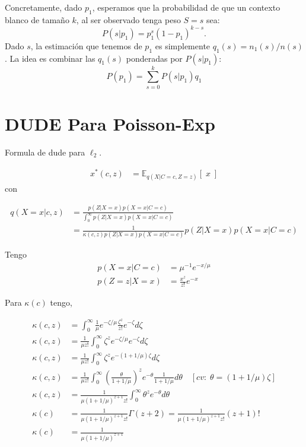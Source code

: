 \documentclass{article}
\def\opt{\ensuremath{^{*}}}
\def\loss{\ell}
\def\expect{\ensuremath{\mathbb{E}}}
\begin{document}
Concretamente, dado $p_1$, esperamos que la probabilidad de que un contexto blanco de tamaño $k$, al ser observado tenga peso $S=s$ sea:
$$P(s|p_1)=p_1^s(1-p_1)^{k-s}.$$
Dado $s$, la estimación que tenemos de $p_1$ es simplemente $q_1(s)=n_1(s)/n(s)$.
La idea es combinar las $q_1(s)$ ponderadas por $P(s|p_1)$:
$$P(p_1) = \sum_{s=0}^{k}P(s|p_1)q_1$$

\section{DUDE Para Poisson-Exp}

Formula de dude para $\ell_2$. 

\begin{align}
x\opt(c,z) &= \expect_{q(X|C=c,Z=z)}\left[\;x\;\right]
\end{align}
con

\begin{align}
q(X=x|c,z) &=
\frac{p(Z|X=x)p(X=x|C=c)}{\int_0^{\infty}{p(Z|X=x)p(X=x|C=c)}} \\
 &= \frac{1}{\kappa(c,z)p(Z|X=x)p(X=x|C=c)} p(Z|X=x)p(X=x|C=c) 
\end{align}


Tengo
\begin{align}
p(X=x|C=c) &= \mu^{-1} e^{-x/\mu}\\
p(Z=z|X=x) &= \frac{x^z}{z!}e^{-x}
\end{align}

Para $\kappa(c)$ tengo,

\begin{align}
\kappa(c,z) &= 
  \int_{0}^{\infty}
  {
    \frac{1}{\mu}
    e^{-\zeta/\mu}
    \frac{\zeta^z}{z!}
    e^{-\zeta} 
    d\zeta
  } \\
\kappa(c,z) &= 
  \frac{1}{\mu{z!}}
  \int_{0}^{\infty}
  {
    \zeta^{z}
    e^{-\zeta/\mu}
    e^{-\zeta} 
    d\zeta
  } \\
\kappa(c,z) &=
  \frac{1}{\mu{z!}}
  \int_{0}^{\infty}
  {
    \zeta^{z}
    e^{-(1+1/\mu)\zeta}
    d\zeta
  } \\
\kappa(c,z) &=
\frac{1}{\mu{z!}}\int_{0}^{\infty}
{
  \left(
    \frac{\theta}{1+1/\mu}
  \right)^{z}
  e^{-\theta}
  \frac{1}{1+1/\mu}
  d\theta
}
\quad [cv:\;\theta=(1+1/\mu)\zeta] \\
\kappa(c,z) &=
\frac{1}{\mu(1+1/\mu)^{z+1}z!}
\int_{0}^{\infty}
{
  \theta^{z}
  e^{-\theta}
  d\theta
} \\
\kappa(c) &=
\frac{1}{\mu(1+1/\mu)^{z+1}z!}
\Gamma(z+2) = 
\frac{1}{\mu(1+1/\mu)^{z+1}z!} (z+1)!
\\
\kappa(c) &= \frac{1}{\mu(1+1/\mu)^{z+1}}
\end{align}
\end{document}
